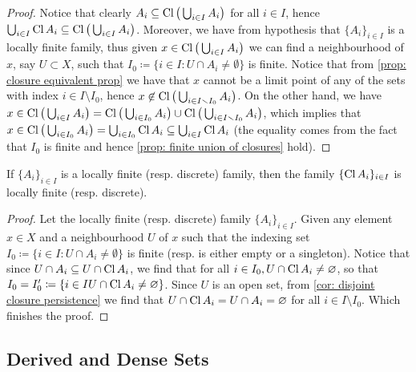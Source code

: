 \begin{proof}
Notice that clearly \(A_i \subseteq \operatorname{Cl}\big(\bigcup_{i \in I} A_i\big)\) for all
\(i \in I\), hence
\(\bigcup_{i \in I} \operatorname{Cl} A_i \subseteq \operatorname{Cl}\big(\bigcup_{i \in I}
A_i\big)\). Moreover, we have from hypothesis that \(\{A_i\}_{i \in I}\) is a
locally finite family, thus given \(x \in \operatorname{Cl}\big(\bigcup_{i \in I} A_i\big)\)
we can find a neighbourhood of \(x\), say \(U \subset X\), such that
\(I_0 \coloneq \{i \in I \colon U \cap A_i \neq \emptyset\}\) is finite. Notice
that from \cref{prop: closure equivalent prop} we have that \(x\) cannot be a
limit point of any of the sets with index \(i \in I \setminus I_0\), hence
\(x \not\in \operatorname{Cl}\big(\bigcup_{i \in I \smallsetminus I_0} A_i\big)\). On the other
hand, we have
\(x \in \operatorname{Cl}\big(\bigcup_{i \in I} A_i\big) = \operatorname{Cl}\big(\bigcup_{i \in I_0}
A_i\big) \cup \operatorname{Cl}\big(\bigcup_{i \in I \smallsetminus I_0} A_i\big)\), which implies
that
\(x \in \operatorname{Cl}\big(\bigcup_{i \in I_0} A_i\big) = \bigcup_{i \in I_0} \operatorname{Cl} A_i
\subseteq \bigcup_{i \in I} \operatorname{Cl} A_i\) (the equality comes from the fact
that \(I_0\) is finite and hence \cref{prop: finite union of closures} hold).
\end{proof}

\begin{proposition}
If \(\{A_i\}_{i \in I}\) is a locally finite (resp. discrete) family, then the
family \(\{\operatorname{Cl} A_i\}_{i \in I}\) is locally finite (resp. discrete).
\end{proposition}

\begin{proof}
Let the locally finite (resp. discrete) family \(\{A_i\}_{i \in I}\). Given
any element \(x \in X\) and a neighbourhood \(U\) of \(x\) such that the
indexing set \(I_0 \coloneq \{i \in I \colon U \cap A_i \neq \emptyset\}\) is finite
(resp. is either empty or a singleton). Notice that since \(U \cap A_i
\subseteq U \cap \operatorname{Cl} A_i\), we find that for all \(i \in I_0, U \cap
\operatorname{Cl} A_i \neq \varnothing\), so that \(I_0 = I_0' \coloneq \{i \in I \relax U \cap
\operatorname{Cl} A_i \neq \varnothing\}\). Since \(U\) is an open set, from \cref{cor:
disjoint closure persistence} we find that \(U \cap \operatorname{Cl} A_i = U \cap
A_i = \varnothing\) for all \(i \in I \setminus I_0\). Which finishes the proof.
\end{proof}

\subsection{Derived and Dense Sets}

